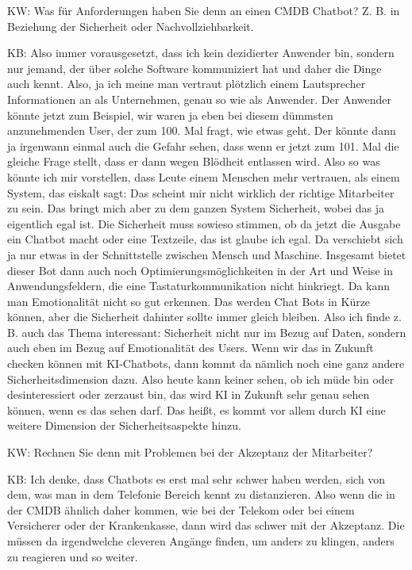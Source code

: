 \begin{list}{X:}{\setlength{\labelsep}{5mm}}
\item[KW:] Was für Anforderungen haben Sie denn an einen CMDB Chatbot? Z. B. in Beziehung der Sicherheit oder Nachvollziehbarkeit.
\item[KB:] Also immer vorausgesetzt, dass ich kein dezidierter Anwender bin, sondern nur jemand, der über solche Software kommuniziert hat und daher die Dinge auch kennt. Also, ja ich meine man vertraut plötzlich einem Lautsprecher Informationen an als Unternehmen, genau so wie als Anwender. Der Anwender könnte jetzt zum Beispiel, wir waren ja eben bei diesem dümmsten anzunehmenden User, der zum 100. Mal fragt, wie etwas geht. Der könnte dann ja irgenwann einmal auch die Gefahr sehen, dass wenn er jetzt zum 101. Mal die gleiche Frage stellt, dass er dann wegen Blödheit entlassen wird. Also so was könnte ich mir vorstellen, dass Leute einem Menschen mehr vertrauen, als einem System, das eiskalt sagt: Das scheint mir nicht wirklich der richtige Mitarbeiter zu sein. Das bringt mich aber zu dem ganzen System Sicherheit, wobei das ja eigentlich egal ist. Die Sicherheit muss sowieso stimmen, ob da jetzt die Ausgabe ein Chatbot macht oder eine Textzeile, das ist glaube ich egal. Da verschiebt sich ja nur etwas in der Schnittstelle zwischen Mensch und Maschine. Insgesamt bietet dieser Bot dann auch noch Optimierungsmöglichkeiten in der Art und Weise in Anwendungsfeldern, die eine Tastaturkommunikation nicht hinkriegt. Da kann man Emotionalität nicht so gut erkennen. Das werden Chat Bots in Kürze können, aber die Sicherheit dahinter sollte immer gleich bleiben. Also ich finde z. B. auch das Thema interessant: Sicherheit nicht nur im Bezug auf Daten, sondern auch eben im Bezug auf Emotionalität des Users. Wenn wir das in Zukunft checken können mit KI-Chatbots, dann kommt da nämlich noch eine ganz andere Sicherheitsdimension dazu. Also heute kann keiner sehen, ob ich müde bin oder desinteressiert oder zerzaust bin, das wird KI in Zukunft sehr genau sehen können, wenn es das sehen darf. Das heißt, es kommt vor allem durch KI eine weitere Dimension der Sicherheitsaspekte hinzu.
\item[KW:] Rechnen Sie denn mit Problemen bei der Akzeptanz der Mitarbeiter?
\item[KB:] Ich denke, dass Chatbots es erst mal sehr schwer haben werden, sich von dem, was man in dem Telefonie Bereich kennt zu distanzieren. Also wenn die in der CMDB ähnlich daher kommen, wie bei der Telekom oder bei einem Versicherer oder der Krankenkasse, dann wird das schwer mit der Akzeptanz. Die müssen da irgendwelche cleveren Angänge finden, um anders zu klingen, anders zu reagieren und so weiter. 

\end{list}
